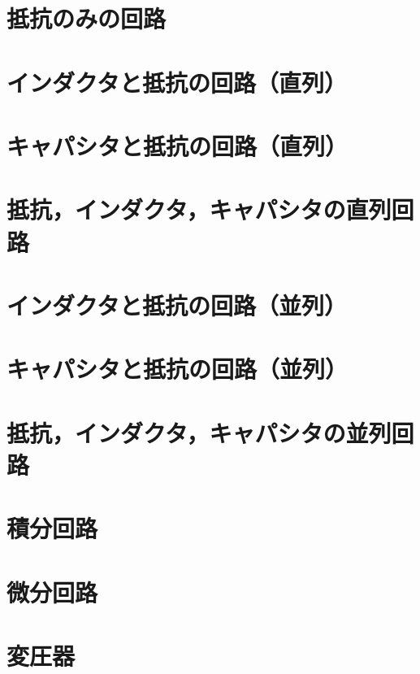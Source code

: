 ﻿%

    \section{抵抗のみの回路}
    \section{インダクタと抵抗の回路（直列）}
    \section{キャパシタと抵抗の回路（直列）}
    \section{抵抗，インダクタ，キャパシタの直列回路}
    \section{インダクタと抵抗の回路（並列）}
    \section{キャパシタと抵抗の回路（並列）}
    \section{抵抗，インダクタ，キャパシタの並列回路}
    \section{積分回路}
    \section{微分回路}
    \section{変圧器}
